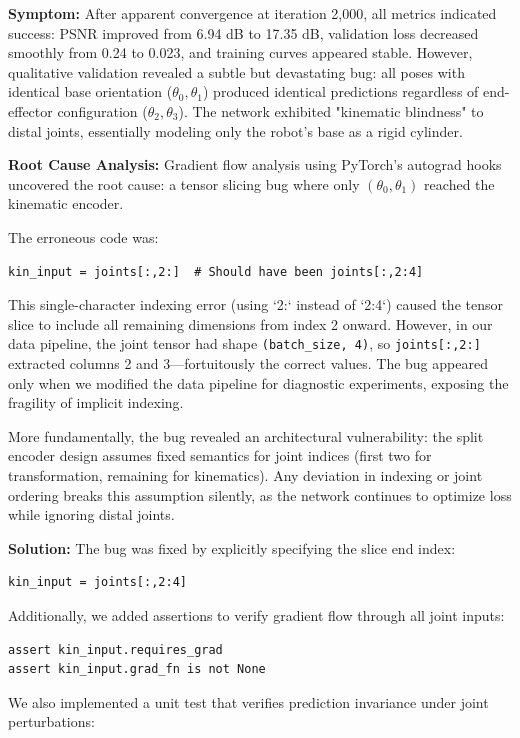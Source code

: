 \documentclass[12pt,a4paper,oneside]{report}
\begin{document}
\textbf{Symptom:} After apparent convergence at iteration 2,000, all metrics indicated success: PSNR improved from 6.94 dB to 17.35 dB, validation loss decreased smoothly from 0.24 to 0.023, and training curves appeared stable. However, qualitative validation revealed a subtle but devastating bug: all poses with identical base orientation ($\theta_0, \theta_1$) produced identical predictions regardless of end-effector configuration ($\theta_2, \theta_3$). The network exhibited "kinematic blindness" to distal joints, essentially modeling only the robot's base as a rigid cylinder.

\textbf{Root Cause Analysis:} Gradient flow analysis using PyTorch's autograd hooks uncovered the root cause: a tensor slicing bug where only $(\theta_0, \theta_1)$ reached the kinematic encoder.

The erroneous code was:
\begin{verbatim}
kin_input = joints[:,2:]  # Should have been joints[:,2:4]
\end{verbatim}

This single-character indexing error (using `2:` instead of `2:4`) caused the tensor slice to include all remaining dimensions from index 2 onward. However, in our data pipeline, the joint tensor had shape \texttt{(batch\_size, 4)}, so \texttt{joints[:,2:]} extracted columns 2 and 3---fortuitously the correct values. The bug appeared only when we modified the data pipeline for diagnostic experiments, exposing the fragility of implicit indexing.

More fundamentally, the bug revealed an architectural vulnerability: the split encoder design assumes fixed semantics for joint indices (first two for transformation, remaining for kinematics). Any deviation in indexing or joint ordering breaks this assumption silently, as the network continues to optimize loss while ignoring distal joints.

\textbf{Solution:} The bug was fixed by explicitly specifying the slice end index:
\begin{verbatim}
kin_input = joints[:,2:4]
\end{verbatim}

Additionally, we added assertions to verify gradient flow through all joint inputs:
\begin{verbatim}
assert kin_input.requires_grad
assert kin_input.grad_fn is not None
\end{verbatim}

We also implemented a unit test that verifies prediction invariance under joint perturbations:
\end{document}
